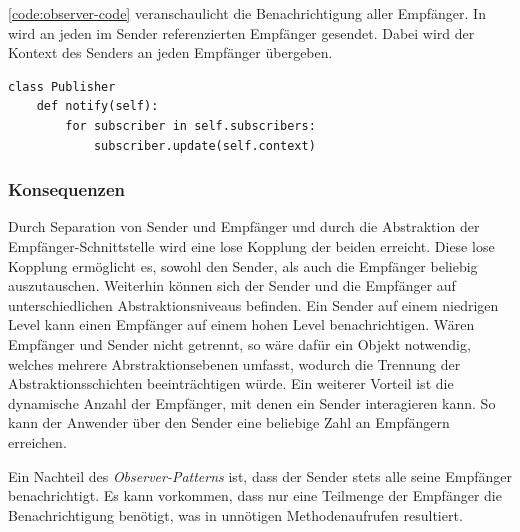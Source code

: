 \autoref{code:observer-code} veranschaulicht die Benachrichtigung aller Empfänger. In  wird an jeden im Sender referenzierten Empfänger  gesendet. Dabei wird der Kontext des Senders an jeden Empfänger übergeben.

\lstset{language=python}
\begin{lstlisting}[caption={Quelltext der Methode \code{notify} des Publishers, welche über alle Empfänger iteriert und diese benachrichtigt.}, label=code:observer-code]
class Publisher
	def notify(self):
        for subscriber in self.subscribers:
            subscriber.update(self.context)
\end{lstlisting}


\subsubsection*{Konsequenzen}

Durch Separation von Sender und Empfänger und durch die Abstraktion der Empfänger-Schnittstelle wird eine lose Kopplung der beiden erreicht. Diese lose Kopplung ermöglicht es, sowohl den Sender, als auch die Empfänger beliebig auszutauschen. Weiterhin können sich der Sender und die Empfänger auf unterschiedlichen Abstraktionsniveaus befinden. Ein Sender auf einem niedrigen Level kann einen Empfänger auf einem hohen Level benachrichtigen. Wären Empfänger und Sender nicht getrennt, so wäre dafür ein Objekt notwendig, welches mehrere Abrstraktionsebenen umfasst, wodurch die Trennung der Abstraktionsschichten beeinträchtigen würde. Ein weiterer Vorteil ist die dynamische Anzahl der Empfänger, mit denen ein Sender interagieren kann. So kann der Anwender über den Sender eine beliebige Zahl an Empfängern erreichen.

Ein Nachteil des \emph{Observer-Patterns} ist, dass der Sender stets alle seine Empfänger benachrichtigt. Es kann vorkommen, dass nur eine Teilmenge der Empfänger die Benachrichtigung benötigt, was in unnötigen Methodenaufrufen resultiert. \cite{gamma_design_1995}